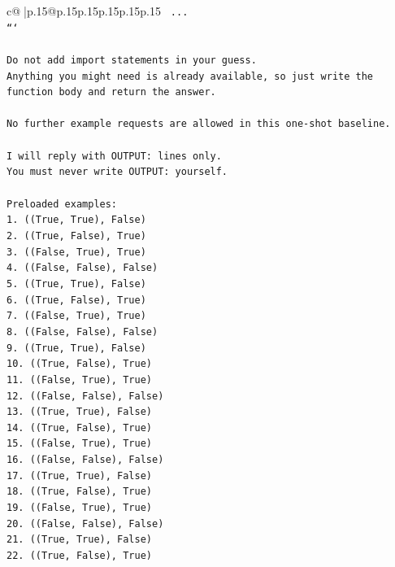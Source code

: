 \documentclass{article}
\begin{document}
{\begin{supertabular}{c@{$\;$}|p{.15\linewidth}@{}p{.15\linewidth}p{.15\linewidth}p{.15\linewidth}p{.15\linewidth}p{.15\linewidth}}
{{{\texttt{    ...} \\
\texttt{```} \\
\\ 
\texttt{Do not add import statements in your guess.} \\
\texttt{Anything you might need is already available, so just write the function body and return the answer.} \\
\\ 
\texttt{No further example requests are allowed in this one{-}shot baseline.} \\
\\ 
\texttt{I will reply with OUTPUT: lines only.} \\
\texttt{You must never write OUTPUT: yourself.} \\
\\ 
\texttt{Preloaded examples:} \\
\texttt{1. ((True, True), False)} \\
\texttt{2. ((True, False), True)} \\
\texttt{3. ((False, True), True)} \\
\texttt{4. ((False, False), False)} \\
\texttt{5. ((True, True), False)} \\
\texttt{6. ((True, False), True)} \\
\texttt{7. ((False, True), True)} \\
\texttt{8. ((False, False), False)} \\
\texttt{9. ((True, True), False)} \\
\texttt{10. ((True, False), True)} \\
\texttt{11. ((False, True), True)} \\
\texttt{12. ((False, False), False)} \\
\texttt{13. ((True, True), False)} \\
\texttt{14. ((True, False), True)} \\
\texttt{15. ((False, True), True)} \\
\texttt{16. ((False, False), False)} \\
\texttt{17. ((True, True), False)} \\
\texttt{18. ((True, False), True)} \\
\texttt{19. ((False, True), True)} \\
\texttt{20. ((False, False), False)} \\
\texttt{21. ((True, True), False)} \\
\texttt{22. ((True, False), True)} \\
}}}
\end{supertabular}}
\end{document}
